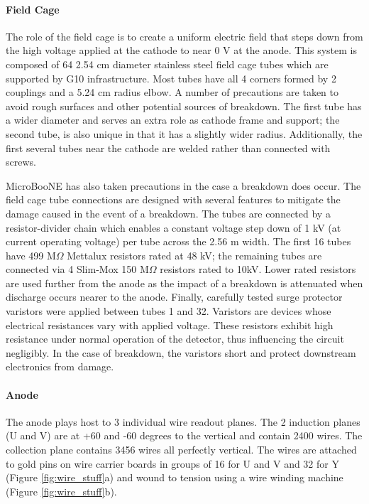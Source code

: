 \documentclass[12pt]{article}
\begin{document}
\paragraph{Field Cage}
\par The role of the field cage is to create a uniform electric field that steps down from the high voltage applied at the cathode to near 0 V at the anode.  This system is composed of 64 2.54 cm diameter stainless steel field cage tubes which are supported by G10 infrastructure. Most tubes have all 4 corners formed by 2 couplings and a 5.24 cm radius elbow. A number of precautions are taken to avoid rough surfaces and other potential sources of breakdown. The first tube has a wider diameter and serves an extra role as cathode frame and support; the second tube, is also unique in that it has a slightly wider radius. Additionally, the first several tubes near the cathode are welded rather than connected with screws.
\par MicroBooNE has also taken precautions in the case a breakdown does occur. The field cage tube connections are designed with several features to mitigate the damage caused in the event of a breakdown. The tubes are connected by a resistor-divider chain which enables a constant voltage step down of 1 kV (at current operating voltage) per tube across the 2.56 m width. The first 16 tubes have 499 M$\Omega$ Mettalux resistors rated at 48 kV; the remaining tubes are connected via 4 Slim-Mox 150 M$\Omega$ resistors rated to 10kV. Lower rated resistors are used further from the anode as the impact of a breakdown is attenuated when discharge occurs nearer to the anode. Finally, carefully tested surge protector varistors \cite{bib:surge} were applied between tubes 1 and 32.  Varistors are devices whose electrical resistances vary with applied voltage. These resistors exhibit high resistance under normal operation of the detector, thus influencing the circuit negligibly. In the case of breakdown, the varistors short and protect downstream electronics from damage.

\paragraph{Anode}
\par The anode plays host to 3 individual wire readout planes. The 2 induction planes (U and V) are at +60 and -60 degrees to the vertical and contain 2400 wires. The collection plane contains 3456 wires all perfectly vertical. The wires are attached to gold pins on wire carrier boards in groups of 16 for U and V and 32 for Y (Figure \ref{fig:wire_stuff}a) and wound to tension using a wire winding machine (Figure \ref{fig:wire_stuff}b). 
\end{document}

